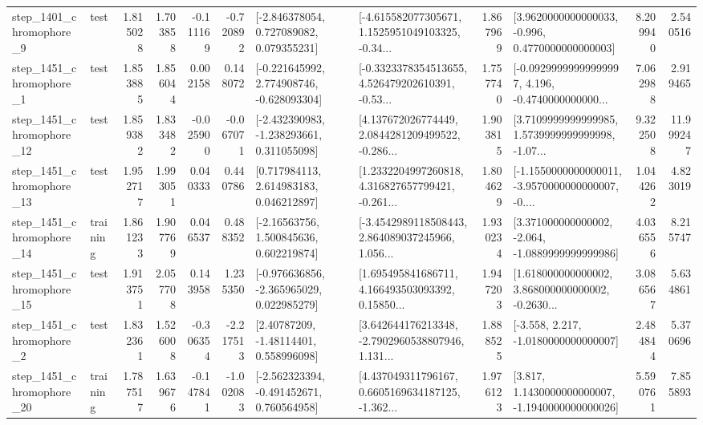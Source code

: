 \begin{tabular}{llrrrrllrlrr}
  step\_1401\_chromophore\_9 &      test &      1.815028 &    1.703858 &     -0.111169 & -0.720892 &    [-2.846378054, 0.727089082, 0.079355231] &  [-4.615582077305671, 1.1525951049103325, -0.34... &       1.867969 &   [3.9620000000000033, -0.996, 0.4770000000000003] &            8.209940 &          2.540516 \\
  step\_1451\_chromophore\_1 &      test &      1.853885 &    1.856044 &      0.002158 &  0.148072 &   [-0.221645992, 2.774908746, -0.628093304] &  [-0.3323378354513655, 4.526479202610391, -0.53... &       1.757740 &  [-0.09299999999999997, 4.196, -0.4740000000000... &            7.062988 &          2.919465 \\
 step\_1451\_chromophore\_12 &      test &      1.859382 &    1.833482 &     -0.025900 & -0.067071 &   [-2.432390983, -1.238293661, 0.311055098] &  [4.137672026774449, 2.0844281209499522, -0.286... &       1.903815 &  [3.7109999999999985, 1.5739999999999998, -1.07... &            9.322508 &         11.999247 \\
 step\_1451\_chromophore\_13 &      test &      1.952717 &    1.993051 &      0.040333 &  0.440786 &     [0.717984113, 2.614983183, 0.046212897] &  [1.2332204997260818, 4.316827657799421, -0.261... &       1.804629 &  [-1.1550000000000011, -3.9570000000000007, -0.... &            1.044262 &          4.823019 \\
 step\_1451\_chromophore\_14 &  training &      1.861233 &    1.907769 &      0.046537 &  0.488352 &     [-2.16563756, 1.500845636, 0.602219874] &  [-3.4542989118508443, 2.864089037245966, 1.056... &       1.930234 &   [3.371000000000002, -2.064, -1.0889999999999986] &            4.036556 &          8.215747 \\
 step\_1451\_chromophore\_15 &      test &      1.913751 &    2.057708 &      0.143958 &  1.235350 &   [-0.976636856, -2.365965029, 0.022985279] &  [1.695495841686711, 4.166493503093392, 0.15850... &       1.947203 &  [1.618000000000002, 3.868000000000002, -0.2630... &            3.086567 &          5.634861 \\
  step\_1451\_chromophore\_2 &      test &      1.832361 &    1.526008 &     -0.306354 & -2.217513 &      [2.40787209, -1.48114401, 0.558996098] &  [3.642644176213348, -2.7902960538807946, 1.131... &       1.888525 &               [-3.558, 2.217, -1.0180000000000007] &            2.484844 &          5.370696 \\
 step\_1451\_chromophore\_20 &  training &      1.787517 &    1.639676 &     -0.147841 & -1.002083 &   [-2.562323394, -0.491452671, 0.760564958] &  [4.437049311796167, 0.6605169634187125, -1.362... &       1.976123 &   [3.817, 1.1430000000000007, -1.1940000000000026] &            5.590761 &          7.855893 \\

\end{tabular}

